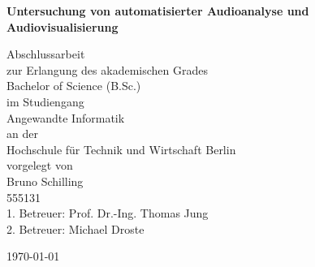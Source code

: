 \documentclass[11pt,a4paper]{article}
\begin{document}
\begin{titlepage}
\centering

\vspace*{10pt}
\scshape
{\huge \textbf{Untersuchung von automatisierter Audioanalyse und Audiovisualisierung} \par}

\vspace{70pt}
\large
Abschlussarbeit\\

\vspace{10pt}
\Large
zur Erlangung des akademischen Grades\\
Bachelor of Science (B.Sc.)\\

\vspace{30pt}
\large
im Studiengang\\

\Large
Angewandte Informatik\\

\vspace{30pt}
\large
an der\\

\Large
Hochschule für Technik und Wirtschaft Berlin\\

\vspace{30pt}
\large
vorgelegt von\\

\Large
Bruno Schilling\\

\large
555131\\

\vspace{30pt}
\Large
1. Betreuer: Prof. Dr.-Ing. Thomas Jung\\
2. Betreuer: Michael Droste\\

\vfill
{\large \today\par}
\end{titlepage}

\newpage

\tableofcontents
\newpage


\normalsize
\end{document}
